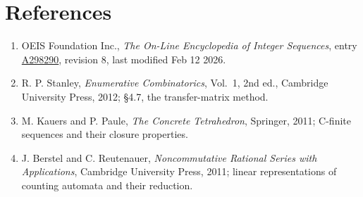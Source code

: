 \documentclass[11pt]{article}
\theoremstyle{definition}
\begin{document}
\section{References}

\begin{enumerate}

\item OEIS Foundation Inc., \emph{The On-Line Encyclopedia of Integer Sequences}, entry \href{https://oeis.org/A298290}{A298290}, revision 8, last modified Feb 12 2026.

\item R. P. Stanley, \emph{Enumerative Combinatorics}, Vol.~1, 2nd ed., Cambridge University Press, 2012; \S4.7, the transfer-matrix method.

\item M. Kauers and P. Paule, \emph{The Concrete Tetrahedron}, Springer, 2011; C-finite sequences and their closure properties.

\item J. Berstel and C. Reutenauer, \emph{Noncommutative Rational Series with Applications}, Cambridge University Press, 2011; linear representations of counting automata and their reduction.

\end{enumerate}
\end{document}
